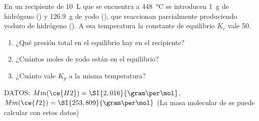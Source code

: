 En un recipiente de \SI{10}{\liter} que se encuentra a \SI{448}{\celsius} se introducen \SI{1}{\gram} de hidrógeno () y \SI{126,9}{\gram} de yodo (), que reaccionan parcialmente produciendo yoduro de hidrógeno (). A esa temperatura la constante de equilibrio $K_c$ vale \num{50}.
\begin{enumerate}[label={\alph*)},font=\bfseries]
	\item ¿Qué presión total en el equilibrio hay en el recipiente?\label{part:eq-presion_total}
	\item ¿Cuántos moles de yodo están en el equilibrio?\label{part:eq-I2_sin_reaccionar}
	\item ¿Cuánto vale $K_p$ a la misma temperatura?\label{part:eq-Kp}
\end{enumerate}
DATOS: $Mm(\ce{H2}) = \SI{2,016}{\gram\per\mol}$, $Mm(\ce{I2}) = \SI{253,809}{\gram\per\mol}$ (La masa molecular de  se puede calcular con estos datos)
